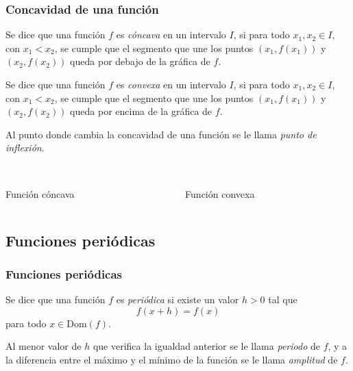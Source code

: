\begin{frame}
\frametitle{Concavidad de una función}
\begin{definicion}
Se dice que una función $f$ es \emph{cóncava} en un intervalo $I$, si para todo $x_1,x_2\in I$, con $x_1<x_2$, se cumple
que el segmento que une los puntos $(x_1,f(x_1))$ y $(x_2,f(x_2))$ queda por debajo de la gráfica de $f$.

Se dice que una función $f$ es \emph{convexa} en un intervalo $I$, si para todo $x_1,x_2\in I$, con $x_1<x_2$, se cumple
que el segmento que une los puntos $(x_1,f(x_1))$ y $(x_2,f(x_2))$ queda por encima de la gráfica de $f$.

Al punto donde cambia la concavidad de una función se le llama \emph{punto de inflexión}.
\end{definicion}

\begin{columns}
\begin{column}{0.4\textwidth}
\begin{center}
\scalebox{1}{}\\
\color{red}Función cóncava
\end{center}
\end{column}
\begin{column}{0.4\textwidth}
\begin{center}
\scalebox{1}{}\\
\color{red}Función convexa
\end{center}
\end{column}
\end{columns}
\end{frame} 



\subsection{Funciones periódicas}
\begin{frame}
\frametitle{Funciones periódicas}
\begin{definicion}
Se dice que una función $f$ es \emph{periódica} si existe un valor $h>0$ tal que
\[f(x+h)=f(x)\]
para todo $x\in \textrm{Dom}(f)$.

Al menor valor de $h$ que verifica la igualdad anterior se le llama \emph{periodo} de $f$, y a la diferencia entre el
máximo y el mínimo de la función se le llama \emph{amplitud} de $f$.
\end{definicion}

\begin{center}
\scalebox{1}{}
\end{center}
\end{frame} 



